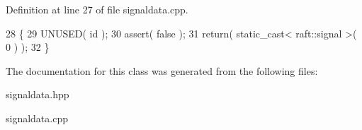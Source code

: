 Definition at line 27 of file signaldata.\+cpp.


\begin{DoxyCode}
28 \{
29     UNUSED( \textcolor{keywordtype}{id} );
30     assert( \textcolor{keyword}{false} );
31     \textcolor{keywordflow}{return}( static\_cast< raft::signal >( 0 ) ); 
32 \}
\end{DoxyCode}


The documentation for this class was generated from the following files\+:\begin{DoxyCompactItemize}
\item 
signaldata.\+hpp\item 
signaldata.\+cpp\end{DoxyCompactItemize}

